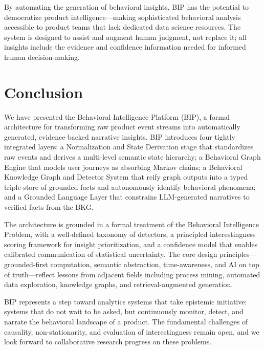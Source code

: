 \documentclass[12pt, a4paper]{article}
\begin{document}
By automating the generation of behavioral insights, BIP has the potential to democratize product intelligence---making sophisticated behavioral analysis accessible to product teams that lack dedicated data science resources. The system is designed to assist and augment human judgment, not replace it; all insights include the evidence and confidence information needed for informed human decision-making.

\section{Conclusion}
\label{sec:conclusion}

We have presented the Behavioral Intelligence Platform (BIP), a formal architecture for transforming raw product event streams into automatically generated, evidence-backed narrative insights. BIP introduces four tightly integrated layers: a Normalization and State Derivation stage that standardizes raw events and derives a multi-level semantic state hierarchy; a Behavioral Graph Engine that models user journeys as absorbing Markov chains; a Behavioral Knowledge Graph and Detector System that reify graph outputs into a typed triple-store of grounded facts and autonomously identify behavioral phenomena; and a Grounded Language Layer that constrains LLM-generated narratives to verified facts from the BKG.

The architecture is grounded in a formal treatment of the Behavioral Intelligence Problem, with a well-defined taxonomy of detectors, a principled interestingness scoring framework for insight prioritization, and a confidence model that enables calibrated communication of statistical uncertainty. The core design principles---grounded-first computation, semantic abstraction, time-awareness, and AI on top of truth---reflect lessons from adjacent fields including process mining, automated data exploration, knowledge graphs, and retrieval-augmented generation.

BIP represents a step toward analytics systems that take epistemic initiative: systems that do not wait to be asked, but continuously monitor, detect, and narrate the behavioral landscape of a product. The fundamental challenges of causality, non-stationarity, and evaluation of interestingness remain open, and we look forward to collaborative research progress on these problems.




\end{document}
